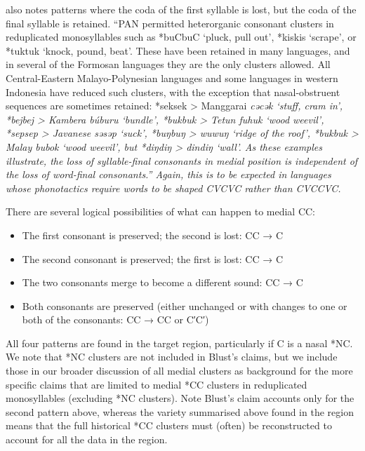 \citet[222]{Blust2013} also notes patterns where the coda of
the first syllable is lost,
but the coda of the final syllable is retained.
“PAN permitted heterorganic consonant clusters in reduplicated
monosyllables such as *buCbuC ‘pluck,
pull out’, *kiskis ‘scrape’,
or *tuktuk ‘knock, pound, beat’.
These have been retained in many languages,
and in several of the Formosan languages they are the only clusters allowed.
All Central-Eastern Malayo-Polynesian languages
and some languages in western Indonesia have reduced such clusters,
with the exception that nasal-obstruent sequences are sometimes
retained: *seksek > Manggarai \it{cəcək} ‘stuff,
cram in’, *bejbej > Kambera \it{búburu} ‘bundle’,
*bukbuk > Tetun \it{fuhuk} ‘wood weevil’,
*sepsep > Javanese \it{səsəp} ‘suck’,
*buŋbuŋ > \it{wuwuŋ} ‘ridge of the roof’,
*bukbuk > Malay \it{bubok} ‘wood weevil’,
but *diŋdiŋ > \it{dindiŋ} ‘wall’.
As these examples illustrate,
the loss of syllable-final consonants in medial position is independent
of the loss of word-final consonants.” Again,
this is to be expected in languages whose phonotactics require
words to be shaped CVCVC rather than CVCCVC.

There are several logical possibilities of what can happen to
medial CC:

\begin{itemize}
		\item	The first consonant is preserved; the second is lost: CC → C
		\item	The second consonant is preserved; the first is lost: CC\sub{2} → C
		\item	The two consonants merge to become a different sound: CC → C
		\item	Both consonants are preserved
					(either unchanged or with changes to one or both of the consonants:
					C\sub{1}C\sub{2} → CC or C′C′)
\end{itemize}

All four patterns are found in the target region,
particularly if C is a nasal *NC.
We note that *NC clusters are not included in Blust’s claims,
but we include those in our broader discussion of all medial
clusters as background for the more specific claims that are
limited to medial *CC clusters in reduplicated monosyllables (excluding *NC clusters).
Note Blust’s claim accounts only for the second pattern above,
whereas the variety summarised above found in the region means
that the full historical *CC clusters must (often) be reconstructed
to account for all the data in the region.

